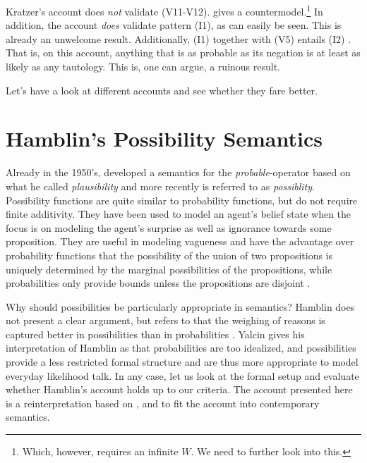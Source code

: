 \documentclass{article}
\theoremstyle{definition}
\begin{document}
Kratzer's account does \emph{not} validate (V11-V12). \textcite[pp.~935, note~8]{yalcin10_probab_operat} gives a countermodel.\footnote{Which, however, requires an infinite $W$. We need to further look into this.}
In addition, the account \emph{does} validate pattern (I1), as can easily be seen. This is already an unwelcome result. Additionally, (I1) together with (V5) entails (I2) \parencite[p.~922]{yalcin10_probab_operat}. That is, on this account, anything that is as probable as its negation is at least as likely as any tautology. This is, one can argue, a ruinous result.

Let's have a look at different accounts and see whether they fare better.

\section{Hamblin's Possibility Semantics}
Already in the 1950's, \textcite{hamblin59_modal_probab} developed a semantics for the \emph{probable}-operator based on what he called \emph{plausibility} and more recently is referred to as \emph{possiblity}. Possibility functions are quite similar to probability functions, but do not require finite additivity. They have been used to model an agent's belief state when the focus is on modeling the agent's surprise as well as ignorance towards some proposition. They are useful in modeling vagueness and have the advantage over probability functions that the possibility of the union of two propositions is uniquely determined by the marginal possibilities of the propositions, while probabilities only provide bounds unless the propositions are disjoint \parencite[][p.~45]{halpern03_reason_about_uncer}.

Why should possibilities be particularly appropriate in semantics? Hamblin does not present a clear argument, but refers to that the weighing of reasons is captured better in possibilities than in probabilities \parencite[][p.~240]{hamblin59_modal_probab}.
Yalcin gives his interpretation of Hamblin as that probabilities are too idealized, and possibilities provide a less restricted formal structure and are thus more appropriate to model everyday likelihood talk.
In any case, let us look at the formal setup and evaluate whether Hamblin's account holds up to our criteria. 
The account presented here is a reinterpretation based on \textcite{hamblin59_modal_probab}, \textcite[][pp.~42]{halpern03_reason_about_uncer} and \textcite{yalcin10_probab_operat} to fit the account into contemporary semantics.
\end{document}
